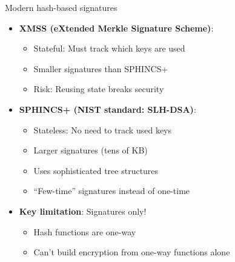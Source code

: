 \documentclass[aspectratio=169, lualatex, handout]{beamer}
\begin{document}
\begin{frame}{Modern hash-based signatures}
	\begin{itemize}
		\item \textbf{XMSS (eXtended Merkle Signature Scheme)}:
		      \begin{itemize}
			      \item Stateful: Must track which keys are used
			      \item Smaller signatures than SPHINCS+
			      \item Risk: Reusing state breaks security
		      \end{itemize}
		\item \textbf{SPHINCS+ (NIST standard: SLH-DSA)}:
		      \begin{itemize}
			      \item Stateless: No need to track used keys
			      \item Larger signatures (tens of KB)
			      \item Uses sophisticated tree structures
			      \item ``Few-time'' signatures instead of one-time
		      \end{itemize}
		\item \textbf{Key limitation}: Signatures only!
		      \begin{itemize}
			      \item Hash functions are one-way
			      \item Can't build encryption from one-way functions alone
		      \end{itemize}
	\end{itemize}
\end{frame}
\end{document}
